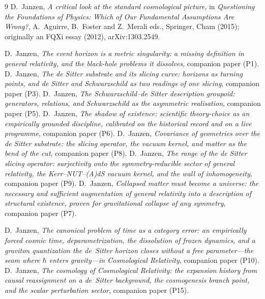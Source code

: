 \documentclass[11pt,a4paper]{article}
\theoremstyle{plain}
\theoremstyle{definition}
\theoremstyle{remark}
\begin{document}
\begin{thebibliography}{9}
 D.~Janzen, \emph{A critical look at the standard cosmological picture}, in \emph{Questioning the Foundations of Physics: Which of Our Fundamental Assumptions Are Wrong?}, A.~Aguirre, B.~Foster and Z.~Merali eds., Springer, Cham (2015); originally an FQXi essay (2012), arXiv:1303.2549.

 D.~Janzen, \emph{The event horizon is a metric singularity: a missing definition in general relativity, and the black-hole problems it dissolves}, companion paper (P1).
 D.~Janzen, \emph{The de Sitter substrate and its slicing curve: horizons as turning points, and de Sitter and Schwarzschild as two readings of one slicing}, companion paper (P3).
 D.~Janzen, \emph{The Schwarzschild--de Sitter description groupoid: generators, relations, and Schwarzschild as the asymmetric realisation}, companion paper (P5).
 D.~Janzen, \emph{The shadow of existence: scientific theory-choice as an empirically grounded discipline, calibrated on the historical record and on a live programme}, companion paper (P6).
 D.~Janzen, \emph{Covariance of geometries over the de Sitter substrate: the slicing operator, the vacuum kernel, and matter as the bend of the cut}, companion paper (P8).
 D.~Janzen, \emph{The range of the de Sitter slicing operator: surjectivity onto the symmetry-reducible sector of general relativity, the Kerr--NUT--(A)dS vacuum kernel, and the wall of inhomogeneity}, companion paper (P9).
 D.~Janzen, \emph{Collapsed matter must become a universe: the necessary and sufficient augmentation of general relativity into a description of structural existence, proven for gravitational collapse of any symmetry}, companion paper (P7).

 D.~Janzen, \emph{The canonical problem of time as a category error: an empirically forced cosmic time, deparametrization, the dissolution of frozen dynamics, and a graviton quantization the de~Sitter horizon closes without a free parameter---the seam where $\hbar$ enters gravity---in Cosmological Relativity}, companion paper (P10).
 D.~Janzen, \emph{The cosmology of Cosmological Relativity: the expansion history from causal reassignment on a de~Sitter background, the cosmogenesis branch point, and the scalar perturbation sector}, companion paper (P15).


\end{thebibliography}
\end{document}
